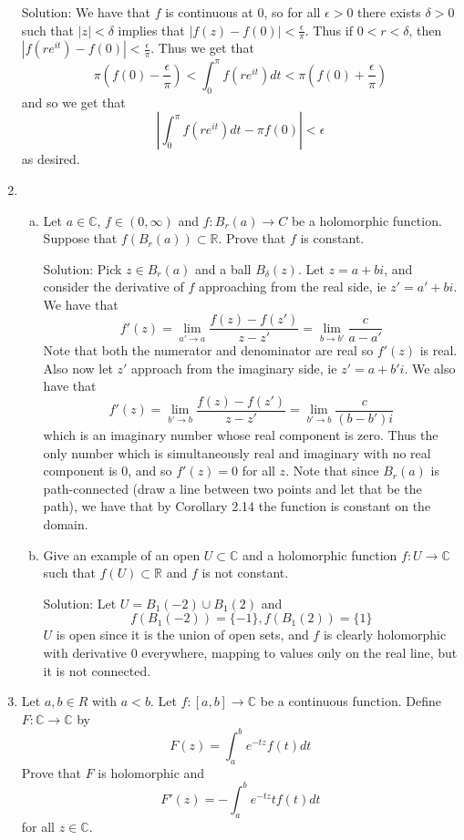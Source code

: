 \documentclass[11pt]{article}
\newcommand{\C}{\mathbb{C}}
\newcommand{\R}{\mathbb{R}}
\begin{document}
\begin{enumerate}[(1)]
Solution: We have that $f$ is continuous at $0$, so for all $\epsilon > 0$ there exists $\delta > 0$ such that $|z| < \delta$ implies that $|f(z) - f(0)| < \frac{\epsilon}{\pi}$. Thus if $0 < r < \delta$, then $|f(re^{it}) - f(0)| < \frac{\epsilon}{\pi}$. Thus we get that 
$$ \pi(f(0) - \frac{\epsilon}{\pi}) < \int_0^{\pi}f(re^{it})dt < \pi(f(0) + \frac{\epsilon}{\pi}) $$
and so we get that 
$$ |\int_0^{\pi}f(re^{it})dt - \pi f(0)| < \epsilon $$
as desired.

\item \begin{enumerate}[(a)] 
\item Let $a \in \C$, $f \in (0, \infty)$ and $f:B_r(a) \to C$ be a holomorphic function. Suppose that $f(B_r(a)) \subset \R$. Prove that $f$ is constant. 

Solution: Pick $z \in B_r(a)$ and a ball $B_\delta(z)$. Let $z = a+bi$, and consider the derivative of $f$ approaching from the real side, ie $z' = a' + bi$. We have that 
$$ f'(z) = \lim_{a' \to a}\frac{f(z) - f(z')}{z - z'} = \lim_{b \to b'}\frac{c}{a-a'} $$
Note that both the numerator and denominator are real so $f'(z)$ is real. Also now let $z'$ approach from the imaginary side, ie $z' = a + b'i$. We also have that 
$$ f'(z) = \lim_{b' \to b}\frac{f(z) - f(z')}{z - z'} = \lim_{b' \to b} \frac{c}{(b-b')i} $$
which is an imaginary number whose real component is zero. Thus the only number which is simultaneously real and imaginary with no real component is $0$, and so $f'(z) = 0$ for all $z$. Note that since $B_r(a)$ is path-connected (draw a line between two points and let that be the path), we have that by Corollary 2.14 the function is constant on the domain.

\item Give an example of an open $U \subset \C$ and a holomorphic function $f: U \to \C$ such that $f(U) \subset \R$ and $f$ is not constant.

Solution: Let $U = B_{1}(-2) \cup B_{1}(2)$
and 
$$ f(B_{1}(-2)) = \{ -1 \}, f(B_{1}(2)) = \{ 1 \} $$
$U$ is open since it is the union of open sets, and $f$ is clearly holomorphic with derivative $0$ everywhere, mapping to values only on the real line, but it is not connected.

\end{enumerate}

\item Let $a, b \in R$ with $a<b$. Let $f:[a,b]\to\C$ be a continuous function. Define $F: \C \to \C$ by 
$$ F(z) = \int_a^b e^{-tz}f(t)dt $$
Prove that $F$ is holomorphic and 
$$F'(z) = -\int_a^b e^{-tz}tf(t)dt $$
for all $z \in \C$.


\end{enumerate}
\end{document}
